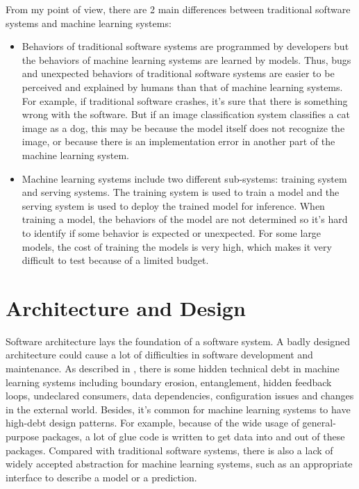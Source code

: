 \documentclass[11pt, a4paper]{article}
\begin{document}
From my point of view, there are 2 main differences between traditional software systems and machine learning systems:
\begin{itemize}
    \item Behaviors of traditional software systems are programmed by developers but the behaviors of machine learning systems are learned by models. 
    Thus, bugs and unexpected behaviors of traditional software systems are easier to be perceived and explained by humans than that of machine learning systems. 
    For example, if traditional software crashes, it's sure that there is something wrong with the software.
    But if an image classification system classifies a cat image as a dog,
    this may be because the model itself does not recognize the image, 
    or because there is an implementation error in another part of the machine learning system.
    \item Machine learning systems include two different sub-systems: 
    training system and serving systems.
    The training system is used to train a model
    and the serving system is used to deploy the trained model for inference.
    When training a model, the behaviors of the model are not determined
    so it's hard to identify if some behavior is expected or unexpected.
    For some large models, the cost of training the models is very high, which makes
    it very difficult to test because of a limited budget.
\end{itemize}

\section{Architecture and Design}
Software architecture lays the foundation of a software system.
A badly designed architecture could cause a lot of difficulties in software development and maintenance.
As described in \cite{NIPS2015_86df7dcf}, there is some hidden technical debt in machine learning systems
including boundary erosion, entanglement,
hidden feedback loops, undeclared consumers, data dependencies, configuration
issues and changes in the external world. 
Besides, it's common for machine learning systems to have high-debt design patterns.
For example, because of the wide usage of general-purpose packages,
a lot of glue code is written to get data into and out of these packages.
Compared with traditional software systems, there is also a lack of widely accepted abstraction for machine learning systems,
such as an appropriate interface to describe a model or a prediction.
\end{document}
